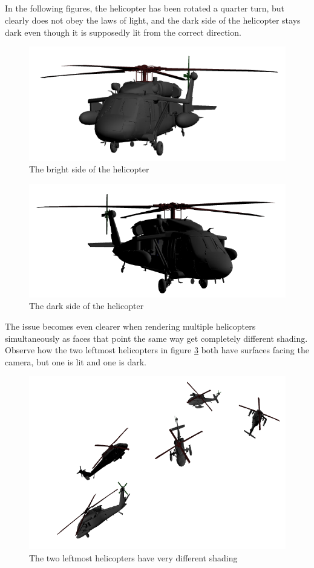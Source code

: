 \documentclass[]{article}
\begin{document}
\begin{multicols}{2}
\subsection{}
In the following figures, the helicopter has been rotated a quarter turn, but clearly does not obey the laws of light, and the dark side of the helicopter stays dark even though it is supposedly lit from the correct direction.
\begin{figure}[H]
\centering
\includegraphics[width=0.5\columnwidth]{light-heli}
\caption{The bright side of the helicopter}
\label{fig:light-heli}
\end{figure}

\begin{figure}[H]
\centering
\includegraphics[width=0.5\columnwidth]{dark-heli}
\caption{The dark side of the helicopter}
\label{fig:dark-heli}
\end{figure}

The issue becomes even clearer when rendering multiple helicopters simultaneously as faces that point the same way get completely different shading. Observe how the two leftmost helicopters in figure \ref{fig:darkest} both have surfaces facing the camera, but one is lit and one is dark.

\begin{figure}[H]
\centering
\includegraphics[width=0.5\columnwidth]{darkest-heli}
\caption{The two leftmost helicopters have very different shading}
\label{fig:darkest}
\end{figure}



\end{multicols}
\end{document}
